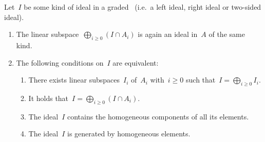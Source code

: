 \begin{lemma}
  \label{characterizations of homogeneous ideals}
  Let~$I$ be some kind of ideal in a graded~{\algebra{$\kf$}} (i.e.\ a left ideal, right ideal or two-sided ideal).
  \begin{enumerate}
    \item
      The linear subspace~$\bigoplus_{i \geq 0} (I \cap A_i)$ is again an ideal in~$A$ of the same kind.
    \item
      The following conditions on~$I$ are equivalent:
      \begin{enumerate}
        \item
          \label{direct sum of linear subspaces}
          There exists linear subspaces~$I_i$ of~$A_i$ with~$i \geq 0$ such that~$I = \bigoplus_{i \geq 0} I_i$.
        \item
          \label{direct sum of intersections}
          It holds that~$I = \bigoplus_{i \geq 0} (I \cap A_i)$.
        \item
          \label{contains all homogeneous components}
          The ideal~$I$ contains the homogeneous components of all its elements.
        \item
          \label{generated by homogeneous}
          The ideal~$I$ is generated by homogeneous elements.
      \end{enumerate}
  \end{enumerate}
\end{lemma}


